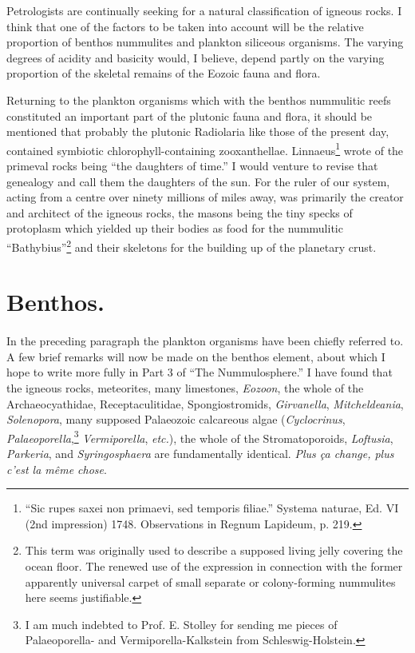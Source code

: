 \documentclass[a4paper, 12pt, oneside]{article}
\begin{document}
Petrologists are continually seeking for a natural classification of igneous rocks. I think that one of the factors to be taken into account will be the relative proportion of benthos nummulites and plankton siliceous organisms. The varying degrees of acidity and basicity would, I believe, depend partly on the varying proportion of the skeletal remains of the Eozoic fauna and flora.

Returning to the plankton organisms which with the benthos nummulitic reefs constituted an important part of the plutonic fauna and flora, it should be mentioned that probably the plutonic Radiolaria like those of the present day, contained symbiotic chlorophyll-containing zooxanthellae. Linnaeus\footnote{``Sic rupes saxei non primaevi, sed temporis filiae.'' Systema naturae, Ed. VI (2nd impression) 1748. Observations in Regnum Lapideum, p. 219.} wrote of the primeval rocks being ``the daughters of time.'' I would venture to revise that genealogy and call them the daughters of the sun. For the ruler of our system, acting from a centre over ninety millions of miles away, was primarily the creator and architect of the igneous rocks, the masons being the tiny specks of protoplasm which yielded up their bodies as food for the nummulitic ``Bathybius''\footnote{This term was originally used to describe a supposed living jelly covering the ocean floor. The renewed use of the expression in connection with the former apparently universal carpet of small separate or colony-forming nummulites here seems justifiable.} and their skeletons for the building up of the planetary crust.

\section{Benthos.}
\paragraph{}
In the preceding paragraph the plankton organisms have been chiefly referred to. A few brief remarks will now be made on the benthos element, about which I hope to write more fully in Part 3 of ``The Nummulosphere.'' I have found that the igneous rocks, meteorites, many limestones, \emph{Eozoon}, the whole of the Archaeocyathidae, Receptaculitidae, Spongiostromids, \emph{Girvanella}, \emph{Mitcheldeania}, \emph{Solenopora}, many supposed Palaeozoic calcareous algae (\emph{Cyclocrinus}, \emph{Palaeoporella},\footnote{I am much indebted to Prof. E. Stolley for sending me pieces of Palaeoporella- and Vermiporella-Kalkstein from Schleswig-Holstein.} \emph{Vermiporella}, \emph{etc.}), the whole of the Stromatoporoids, \emph{Loftusia}, \emph{Parkeria}, and \emph{Syringosphaera} are fundamentally identical. \emph{Plus ça change, plus c'est la même chose}.
\end{document}
